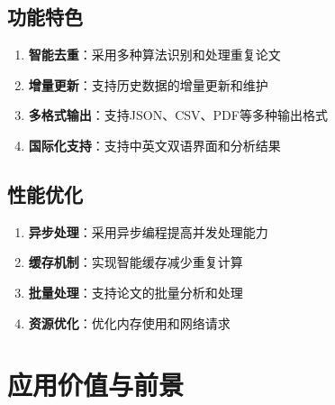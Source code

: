 \documentclass[12pt,a4paper]{article}
\begin{document}
\subsection{功能特色}
\begin{enumerate}
    \item \textbf{智能去重}：采用多种算法识别和处理重复论文
    \item \textbf{增量更新}：支持历史数据的增量更新和维护
    \item \textbf{多格式输出}：支持JSON、CSV、PDF等多种输出格式
    \item \textbf{国际化支持}：支持中英文双语界面和分析结果
\end{enumerate}

\subsection{性能优化}
\begin{enumerate}
    \item \textbf{异步处理}：采用异步编程提高并发处理能力
    \item \textbf{缓存机制}：实现智能缓存减少重复计算
    \item \textbf{批量处理}：支持论文的批量分析和处理
    \item \textbf{资源优化}：优化内存使用和网络请求
\end{enumerate}

\section{应用价值与前景}
\end{document}
